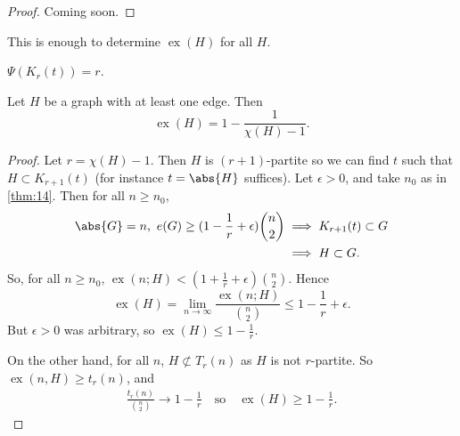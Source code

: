 \documentclass{article}
\DeclareMathOperator{\ext}{ex}
\begin{document}
\begin{proof}
    Coming soon.
\end{proof}

This is enough to determine $\ext(H)$ for all $H$.


\begin{eg}
    $\Psi(K_r(t)) = r$.
\end{eg}

\begin{ncor}\label{cor:15}
    Let $H$ be a graph with at least one edge. Then
    \begin{equation*}
        \ext(H) = 1 - \frac{1}{\chi(H) - 1}.
    \end{equation*}
\end{ncor}

\begin{proof}
    Let $r = \chi(H) - 1$.
    Then $H$ is $(r+1)$-partite so we can find $t$ such that $H \subset K_{r+1}(t)$ (for instance $t = \abs{H}$ suffices).
    Let $\epsilon > 0$, and take $n_0$ as in \cref{thm:14}.
    Then for all $n \geq n_0$,
    \begin{align*}
        \abs{G} = n, \ e(G) \geq (1 - \frac{1}{r} + \epsilon) \binom{n}{2} &\implies K_{r+1}(t) \subset G \\
                                                                           &\implies H \subset G.
    \end{align*}
    So, for all $n \geq n_0$, $\ext(n; H) < (1 + \frac{1}{r} + \epsilon) \binom{n}{2}$. Hence
    \begin{equation*}
        \ext(H) = \lim_{n \to \infty} \frac{\ext(n; H)}{\binom{n}{2}} \leq 1 - \frac{1}{r} + \epsilon.
    \end{equation*}
    But $\epsilon>0$ was arbitrary, so $\ext(H) \leq 1 - \frac{1}{r}$.

    On the other hand, for all $n$, $H \not\subset T_r(n)$ as $H$ is not $r$-partite. So $\ext(n, H) \geq t_r(n)$, and
    \begin{align*}
        \frac{t_r(n)}{\binom{n}{2}} \to 1 - \frac{1}{r} \quad \text{so} \quad \ext(H) \geq 1 - \frac{1}{r}.
    \end{align*}
\end{proof}
\end{document}

